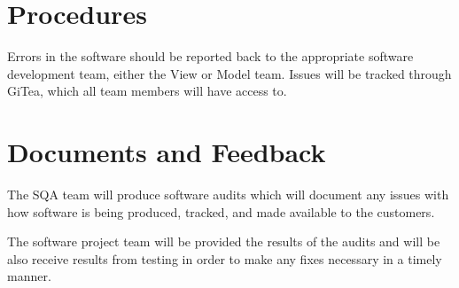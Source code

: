 \documentclass[letterpaper,12pt,oneside,listof=totoc]{scrreprt}
\begin{document}
\section{Procedures}
Errors in the software should be reported back to the appropriate software development team, either the View or Model team. Issues will be tracked through GiTea, which all team members will have access to.


\section{Documents and Feedback}
The SQA team will produce software audits which will document any issues with how software is being produced, tracked, and made available to the customers.

The software project team will be provided the results of the audits and will be also receive results from testing in order to make any fixes necessary in a timely manner.
\end{document}

